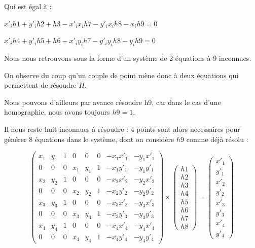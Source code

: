         Qui est égal à :
    
        \begin{center}
            $ x'_ih1 + y'_ih2 + h3 - x'_i x_ih7 - y'_ix_ih8 - x_ih9 = 0 $
    
            $ x'_ih4 + y'_ih5 + h6 - x'_iy_ih7 - y'_iy_ih8 - y_ih9 = 0 $
        \end{center}

        Nous nous retrouvons sous la forme d'un système de 2 équations à 9 inconnues.

        On observe du coup qu'un couple de point mène donc à deux équations qui permettent de résoudre $H$.
    
        Nous pouvons d'ailleurs par avance résoudre h9, car dans le cas d'une homographie, nous avons toujours $h9 = 1$.
    
        Il nous reste huit inconnues à résoudre : 4 points sont alors nécessaires pour générer 8 équations dans le système, dont on considère $h9$ comme déjà résolu : 

        \[
        \begin{pmatrix} 
            x_1 & y_1 & 1 & 0 & 0 & 0 & -x_1 x'_1 & -y_1 x'_1 \\ 
            0 & 0 & 0 & x_1 & y_1 & 1 & -x_1 y'_1 & -y_1 y'_1 \\
    
            x_2 & y_2 & 1 & 0 & 0 & 0 & -x_2 x'_2 & -y_2 x'_2 \\ 
            0 & 0 & 0 & x_2 & y_2 & 1 & -x_2 y'_2 & -y_2 y'_2 \\
    
            x_3 & y_3 & 1 & 0 & 0 & 0 & -x_3 x'_3 & -y_3 x'_3 \\ 
            0 & 0 & 0 & x_3 & y_3 & 1 & -x_3 y'_3 & -y_3 y'_3 \\
    
            x_4 & y_4 & 1 & 0 & 0 & 0 & -x_4 x'_4 & -y_4 x'_4 \\ 
            0 & 0 & 0 & x_4 & y_4 & 1 & -x_4 y'_4 & -y_4 y'_4
        \end{pmatrix} 
        \times
        \begin{pmatrix} h1 \\ h2 \\ h3 \\ h4 \\ h5 \\h6 \\ h7 \\ h8 \end{pmatrix}
        =
        \begin{pmatrix} x'_1 \\ y'_1 \\ x'_2 \\ y'_2 \\ x'_3 \\ y'_3 \\ x'_4 \\ y'_4 \end{pmatrix} 
        \]
    
